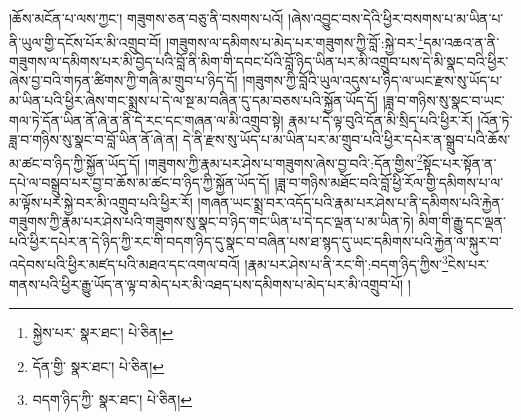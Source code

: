 །ཆོས་མངོན་པ་ལས་ཀྱང་། གཟུགས་ཅན་བཅུ་ནི་བསགས་པའོ། །ཞེས་འབྱུང་བས་དེའི་ཕྱིར་བསགས་པ་མ་ཡིན་པ་ནི་ཡུལ་གྱི་དངོས་པོར་མི་འགྲུབ་བོ། །གཟུགས་ལ་དམིགས་པ་མེད་པར་གཟུགས་ཀྱི་བློ་:སྐྱེ་བར་\footnote{སྐྱེས་པར་  སྣར་ཐང་།  པེ་ཅིན། }དམ་འཆའ་ན་ནི་གཟུགས་ལ་དམིགས་པར་མི་བྱེད་པའི་བློ་ནི་མིག་གི་དབང་པོའི་བློ་ཉིད་ཡིན་པར་མི་འགྲུབ་པས་དེ་མི་སྣང་བའི་ཕྱིར་ཞེས་བྱ་བའི་གཏན་ཚིགས་ཀྱི་གཞི་མ་གྲུབ་པ་ཉིད་དོ། །གཟུགས་ཀྱི་བློའི་ཡུལ་འདུས་པ་ཉིད་ལ་ཡང་རྫས་སུ་ཡོད་པ་མ་ཡིན་པའི་ཕྱིར་ཞེས་གང་སྨྲས་པ་དེ་ལ་སྔ་མ་བཞིན་དུ་དམ་བཅས་པའི་སྐྱོན་ཡོད་དོ། །ཟླ་བ་གཉིས་སུ་སྣང་བ་ཡང་གལ་ཏེ་དོན་ཡིན་ནོ་ཞེ་ན་ནི་དེ་རང་དང་གཞན་ལ་མི་འགྲུབ་སྟེ། རྣམ་པ་དེ་ལྟ་བུའི་དོན་མི་སྲིད་པའི་ཕྱིར་རོ། །འོན་ཏེ་ཟླ་བ་གཉིས་སུ་སྣང་བ་བློ་ཡིན་ནོ་ཞེ་ན། དེ་ནི་རྫས་སུ་ཡོད་པ་མ་ཡིན་པར་མ་གྲུབ་པའི་ཕྱིར་དཔེར་ན་སྒྲུབ་པའི་ཆོས་མ་ཚང་བ་ཉིད་ཀྱི་སྐྱོན་ཡོད་དོ། །གཟུགས་ཀྱི་རྣམ་པར་ཤེས་པ་གཟུགས་ཞེས་བྱ་བའི་:དོན་གྱིས་\footnote{དོན་གྱི་  སྣར་ཐང་།  པེ་ཅིན། }སྟོང་པར་སྟོན་ན་དཔེ་ལ་བསྒྲུབ་པར་བྱ་བ་ཆོས་མ་ཚང་བ་ཉིད་ཀྱི་སྐྱོན་ཡོད་དོ། །ཟླ་བ་གཉིས་མཐོང་བའི་བློ་ཕྱི་རོལ་གྱི་དམིགས་པ་ལ་མ་ལྟོས་པར་སྐྱེ་བར་མི་འགྲུབ་པའི་ཕྱིར་རོ། །གཞན་ཡང་སྨྲ་བར་འདོད་པའི་རྣམ་པར་ཤེས་པ་ནི་དམིགས་པའི་རྐྱེན་གཟུགས་ཀྱི་རྣམ་པར་ཤེས་པའི་གཟུགས་སུ་སྣང་བ་ཉིད་གང་ཡིན་པ་དེ་དང་ལྡན་པ་མ་ཡིན་ཏེ། མིག་གི་རྒྱུ་དང་ལྡན་པའི་ཕྱིར་དཔེར་ན་དེ་ཉིད་ཀྱི་རང་གི་བདག་ཉིད་དུ་སྣང་བ་བཞིན་པས་ཐ་སྙད་དུ་ཡང་དམིགས་པའི་རྐྱེན་ལ་སྐུར་བ་འདེབས་པའི་ཕྱིར་མཛད་པའི་མཐའ་དང་འགལ་བའོ། །རྣམ་པར་ཤེས་པ་ནི་རང་གི་:བདག་ཉིད་ཀྱིས་\footnote{བདག་ཉིད་ཀྱི་  སྣར་ཐང་།  པེ་ཅིན། }ངེས་པར་གནས་པའི་ཕྱིར་རྒྱུ་ཡོད་ན་ལྟ་བ་མེད་པར་མི་འཐད་པས་དམིགས་པ་མེད་པར་མི་འགྲུབ་པོ། །
